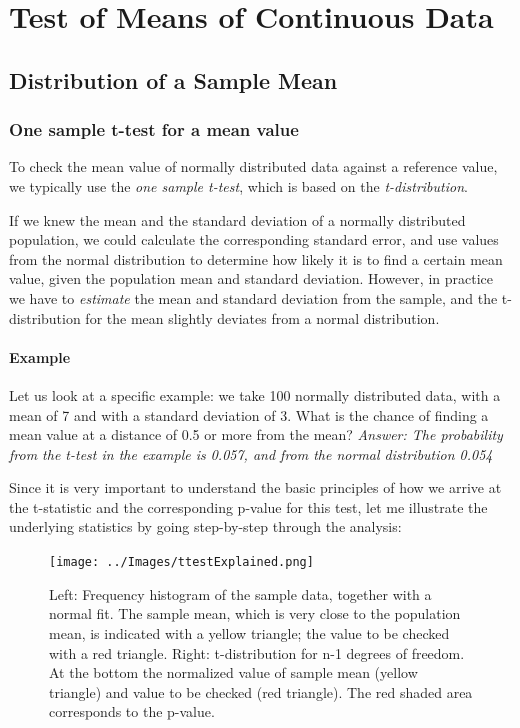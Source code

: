 \chapter{Test of Means of Continuous Data}

\section{Distribution of a Sample Mean}

\subsection{One sample t-test for a mean value} 

To check the mean value of normally distributed data against a reference value, we typically use the \emph{one sample t-test}, which is based on the \emph{t-distribution}.

If we knew the mean and the standard deviation of a normally distributed population, we could calculate the corresponding standard error, and use values from the normal distribution to determine how likely it is to find a certain mean value, given the population mean and standard deviation. However, in practice we have to \emph{estimate} the mean and standard deviation from the sample, and the t-distribution for the mean slightly deviates from a normal distribution.

\subsubsection{Example}

Let us look at a specific example: we take 100 normally distributed data, with a mean of 7 and with a standard deviation of 3.
What is the chance of finding a mean value at a distance of 0.5 or more from the mean? \emph{Answer: The probability from the t-test in the example is 0.057, and from the normal distribution 0.054}

Since it is very important to understand the basic principles of how we arrive at the t-statistic and the corresponding p-value for this test, let me illustrate the underlying statistics by going step-by-step through the analysis:

\begin{figure}
  \centering
  \texttt{[image: ../Images/ttestExplained.png]}\\
  \caption{Left: Frequency histogram of the sample data, together with a normal fit. The sample mean, which is very close to the population mean, is indicated with a yellow triangle; the value to be checked with a red triangle. Right: t-distribution for n-1 degrees of freedom. At the bottom the normalized value of sample mean (yellow triangle) and value to be checked (red triangle). The red shaded area corresponds to the p-value.}\label{fig:ttestExplained}
\end{figure}

